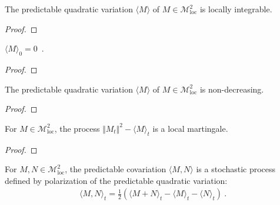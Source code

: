\begin{lemma}\label{lem:locallyIntegrable_quadraticVariation}
  \leanok
The predictable quadratic variation $\langle M \rangle$ of $M \in \mathcal{M}^2_{\mathrm{loc}}$ is locally integrable.
\end{lemma}

\begin{proof}\leanok

\end{proof}


\begin{lemma}\label{lem:quadraticVariation_zero}
$\langle M \rangle_0 = 0$~.
\end{lemma}

\begin{proof}

\end{proof}


\begin{lemma}\label{lem:monotone_quadraticVariation}
  \leanok
The predictable quadratic variation $\langle M \rangle$ of $M \in \mathcal{M}^2_{\mathrm{loc}}$ is non-decreasing.
\end{lemma}

\begin{proof}\leanok

\end{proof}


\begin{lemma}\label{lem:local_martingale_sub_quadraticVariation}
For $M \in \mathcal{M}^2_{\mathrm{loc}}$, the process $\Vert M_t \Vert^2 - \langle M \rangle_t$ is a local martingale.
\end{lemma}

\begin{proof}

\end{proof}


\begin{definition}\label{def:covariation}
  \leanok
For $M, N \in \mathcal{M}^2_{\mathrm{loc}}$, the predictable covariation $\langle M, N \rangle$ is a stochastic process defined by polarization of the predictable quadratic variation:
\begin{align*}
  \langle M, N \rangle_t = \frac{1}{2}\left(\langle M+N \rangle_t - \langle M \rangle_t - \langle N \rangle_t \right)
  \: .
\end{align*}
\end{definition}


